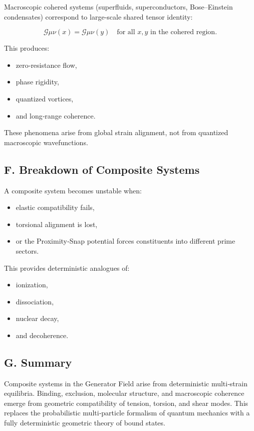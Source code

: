 \documentclass[reprint,amsmath,amssymb,aps,prl,floatfix]{revtex4-2}
\begin{document}
\begin{itemize}
Macroscopic cohered systems (superfluids, superconductors, Bose–Einstein condensates) correspond to large‑scale shared tensor identity:

\[
\mathcal{G}{\mu\nu}(x) = \mathcal{G}{\mu\nu}(y)
\quad\text{for all } x,y \text{ in the cohered region}.
\]

This produces:

\begin{itemize}
\item zero‑resistance flow,  
\item phase rigidity,  
\item quantized vortices,  
\item and long‑range coherence.
\end{itemize}
\medskip

These phenomena arise from global strain alignment, not from quantized macroscopic wavefunctions.

\subsection{F. Breakdown of Composite Systems}

A composite system becomes unstable when:
\begin{itemize}
\item elastic compatibility fails,  
\item torsional alignment is lost,  
\item or the Proximity‑Snap potential forces constituents into different prime sectors.
\end{itemize}

This provides deterministic analogues of:

\begin{itemize}
\item ionization,  
\item dissociation,  
\item nuclear decay,  
\item and decoherence.
\end{itemize}

\subsection{G. Summary}

Composite systems in the Generator Field arise from deterministic multi‑strain equilibria. Binding, exclusion, molecular structure, and macroscopic coherence emerge from geometric compatibility of tension, torsion, and shear modes. This replaces the probabilistic multi‑particle formalism of quantum mechanics with a fully deterministic geometric theory of bound states.


\end{itemize}
\end{document}
